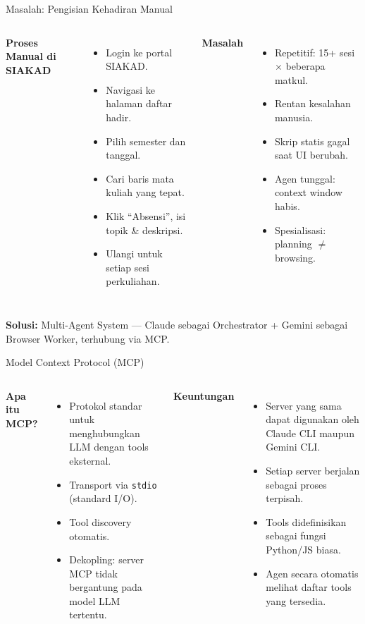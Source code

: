 \documentclass[aspectratio=169, table]{beamer}
\begin{document}
\begin{frame}{Masalah: Pengisian Kehadiran Manual}
\vspace{6pt}
\begin{columns}[T]
\textbf{Proses Manual di SIAKAD}
\begin{itemize}
  \item Login ke portal SIAKAD.
  \item Navigasi ke halaman daftar hadir.
  \item Pilih semester dan tanggal.
  \item Cari baris mata kuliah yang tepat.
  \item Klik ``Absensi'', isi topik \& deskripsi.
  \item Ulangi untuk setiap sesi perkuliahan.
\end{itemize}

\textbf{Masalah}
\begin{itemize}
  \item Repetitif: 15+ sesi $\times$ beberapa matkul.
  \item Rentan kesalahan manusia.
  \item Skrip statis gagal saat UI berubah.
  \item Agen tunggal: context window habis.
  \item Spesialisasi: planning $\neq$ browsing.
\end{itemize}
\end{columns}

\vspace{10pt}
\small
\textbf{Solusi:} Multi-Agent System --- Claude sebagai Orchestrator + Gemini sebagai Browser Worker, terhubung via MCP.
\end{frame}

\begin{frame}{Model Context Protocol (MCP)}
\vspace{6pt}
\begin{columns}[T]
\textbf{Apa itu MCP?}
\begin{itemize}
  \item Protokol standar untuk menghubungkan LLM dengan tools eksternal.
  \item Transport via \texttt{stdio} (standard I/O).
  \item Tool discovery otomatis.
  \item Dekopling: server MCP tidak bergantung pada model LLM tertentu.
\end{itemize}

\textbf{Keuntungan}
\begin{itemize}
  \item Server yang sama dapat digunakan oleh Claude CLI maupun Gemini CLI.
  \item Setiap server berjalan sebagai proses terpisah.
  \item Tools didefinisikan sebagai fungsi Python/JS biasa.
  \item Agen secara otomatis melihat daftar tools yang tersedia.
\end{itemize}
\end{columns}
\end{frame}
\end{document}
